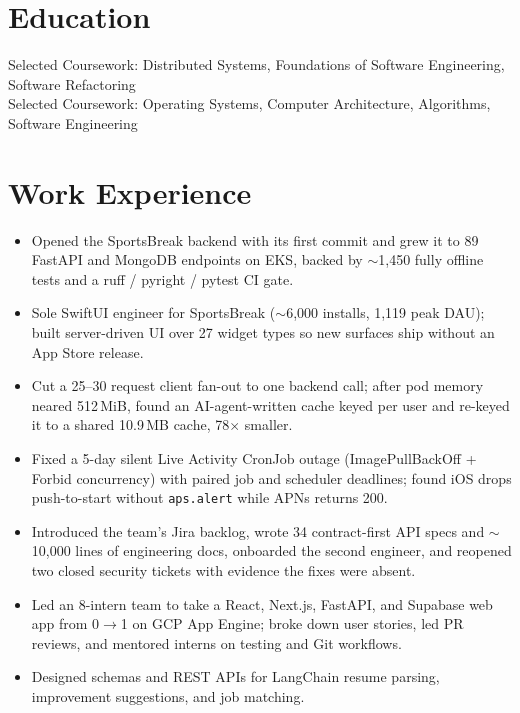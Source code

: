 \documentclass[11pt, letterpaper]{article}
\begin{document}

\section{Education}
Selected Coursework: Distributed Systems, Foundations of Software Engineering, Software Refactoring\\[1pt]
Selected Coursework: Operating Systems, Computer Architecture, Algorithms, Software Engineering

\section{Work Experience}
\begin{itemize}
  \item Opened the SportsBreak backend with its first commit and grew it to 89 FastAPI and MongoDB endpoints on EKS, backed by $\sim$1{,}450 fully offline tests and a ruff / pyright / pytest CI gate.
  \item Sole SwiftUI engineer for SportsBreak ($\sim$6{,}000 installs, 1{,}119 peak DAU); built server-driven UI over 27 widget types so new surfaces ship without an App Store release.
  \item Cut a 25--30 request client fan-out to one backend call; after pod memory neared 512\,MiB, found an AI-agent-written cache keyed per user and re-keyed it to a shared 10.9\,MB cache, 78$\times$ smaller.
  \item Fixed a 5-day silent Live Activity CronJob outage (ImagePullBackOff + Forbid concurrency) with paired job and scheduler deadlines; found iOS drops push-to-start without \texttt{aps.alert} while APNs returns 200.
  \item Introduced the team's Jira backlog, wrote 34 contract-first API specs and $\sim$10{,}000 lines of engineering docs, onboarded the second engineer, and reopened two closed security tickets with evidence the fixes were absent.
\end{itemize}

\vspace{1pt}
\begin{itemize}
  \item Led an 8-intern team to take a React, Next.js, FastAPI, and Supabase web app from 0$\to$1 on GCP App Engine; broke down user stories, led PR reviews, and mentored interns on testing and Git workflows.
  \item Designed schemas and REST APIs for LangChain resume parsing, improvement suggestions, and job matching.
\end{itemize}
\end{document}
